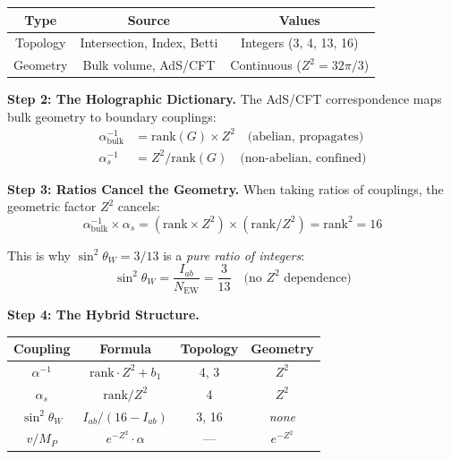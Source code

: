 \documentclass[12pt,a4paper]{article}
\newcommand{\sinW}{\sin^2\theta_W}
\newcommand{\Zsq}{Z^2}
\begin{document}
\begin{center}
\begin{tabular}{|c|c|c|}
\hline
\textbf{Type} & \textbf{Source} & \textbf{Values} \\
\hline
Topology & Intersection, Index, Betti & Integers (3, 4, 13, 16) \\
Geometry & Bulk volume, AdS/CFT & Continuous ($\Zsq = 32\pi/3$) \\
\hline
\end{tabular}
\end{center}

\textbf{Step 2: The Holographic Dictionary.}
The AdS/CFT correspondence maps bulk geometry to boundary couplings:
\begin{align}
\alpha^{-1}_{\text{bulk}} &= \text{rank}(G) \times \Zsq \quad
\text{(abelian, propagates)} \\
\alpha_s^{-1} &= \Zsq / \text{rank}(G) \quad
\text{(non-abelian, confined)}
\end{align}

\textbf{Step 3: Ratios Cancel the Geometry.}
When taking ratios of couplings, the geometric factor $\Zsq$ cancels:
\begin{equation}
\alpha^{-1}_{\text{bulk}} \times \alpha_s =
(\text{rank} \times \Zsq) \times (\text{rank}/\Zsq) =
\text{rank}^2 = 16
\end{equation}

This is why $\sinW = 3/13$ is a \textit{pure ratio of integers}:
\begin{equation}
\sinW = \frac{I_{ab}}{N_{\text{EW}}} = \frac{3}{13}
\quad \text{(no $\Zsq$ dependence)}
\end{equation}

\textbf{Step 4: The Hybrid Structure.}

\begin{center}
\begin{tabular}{|c|c|c|c|}
\hline
\textbf{Coupling} & \textbf{Formula} & \textbf{Topology} & \textbf{Geometry} \\
\hline
$\alpha^{-1}$ & $\text{rank} \cdot \Zsq + b_1$ & 4, 3 & $\Zsq$ \\
$\alpha_s$ & $\text{rank}/\Zsq$ & 4 & $\Zsq$ \\
$\sinW$ & $I_{ab}/(16-I_{ab})$ & 3, 16 & \textit{none} \\
$v/M_P$ & $e^{-\Zsq} \cdot \alpha$ & --- & $e^{-\Zsq}$ \\
\hline
\end{tabular}
\end{center}
\end{document}
